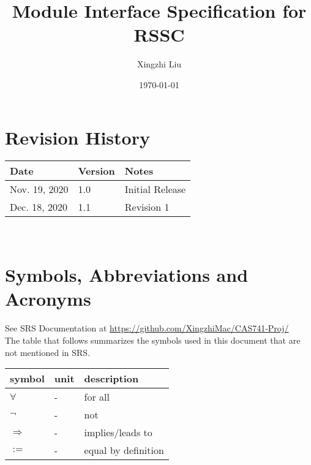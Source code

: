 \documentclass[12pt, titlepage]{article}
\begin{document}
\title{Module Interface Specification for RSSC}

\author{Xingzhi Liu}

\date{\today}

\maketitle


\section{Revision History}

\begin{tabularx}{\textwidth}{p{3cm}p{2cm}X}
\toprule {\bf Date} & {\bf Version} & {\bf Notes}\\
\midrule
Nov. 19, 2020 & 1.0 & Initial Release\\
Dec. 18, 2020 & 1.1 & Revision 1\\
\bottomrule
\end{tabularx}

~\newpage

\section{Symbols, Abbreviations and Acronyms}

See SRS Documentation at \url{https://github.com/XingzhiMac/CAS741-Proj/}\\

The table that follows summarizes the symbols used in this document that are not
mentioned in SRS.

\renewcommand{\arraystretch}{1.2}
\noindent \begin{longtable*}{l l p{12cm}} \toprule
\textbf{symbol} & \textbf{unit} & \textbf{description}\\
\midrule 
$\forall$ & - & for all
\\
$\neg$ & - & not
\\
$\Rightarrow$ & - & implies/leads to
\\
$:=$ & - & equal by definition
\\
\bottomrule
\end{longtable*}

\newpage

\tableofcontents

\newpage
\end{document}

